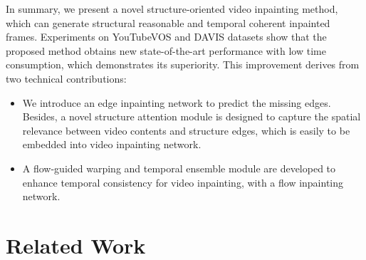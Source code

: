 In summary, we present a novel structure-oriented video inpainting method, which can generate structural reasonable and temporal coherent inpainted frames.
%
Experiments on YouTubeVOS and DAVIS datasets show that the proposed method obtains new state-of-the-art performance with low time consumption, which demonstrates its superiority.
%
This improvement derives from two technical contributions:
\begin{itemize}

\item We introduce an edge inpainting network to predict the missing edges. Besides, a novel structure attention module is designed to capture the spatial relevance between video contents and structure edges, which is easily to be embedded into video inpainting network. %
\item A flow-guided warping and temporal ensemble module are developed to enhance temporal consistency for video inpainting, with a flow inpainting network.

	
	
\end{itemize}





\section{Related Work}
